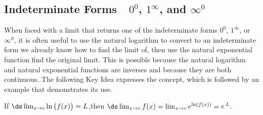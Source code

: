 \subsection{Indeterminate Forms\ \ \texorpdfstring{$0^0$, $1^\infty$, and $\infty^0$}{0\^{}0, 1\^{}∞, and ∞\^{}0}}

When faced with a limit that returns one of the indeterminate forms $0^0$, $1^\infty$, or $\infty^0$, it is often useful to use the natural logarithm to convert to an indeterminate form we already know how to find the limit of, then use the natural exponential function find the original limit. This is possible because the natural logarithm and natural exponential functions are inverses and because they are both continuous. The following Key Idea expresses the concept, which is followed by an example that demonstrates its use.

{If $\ds \lim_{x\to c} \ln\big(f(x)\big) = L$,\quad then 
$\ds \lim_{x\to c} f(x) = \lim_{x\to c} e^{\ln(f(x))} = e\,^L.$ }

